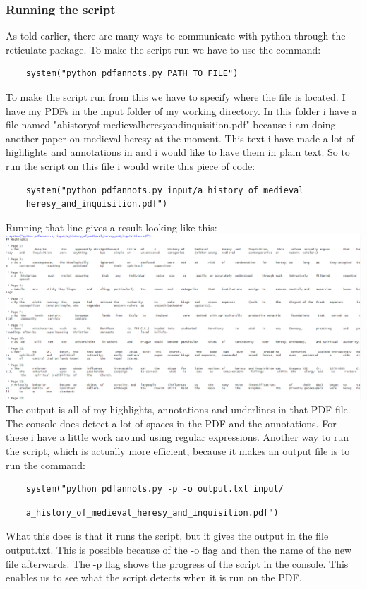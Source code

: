 \documentclass{article}
\begin{document}
\subsubsection{Running the script}
As told earlier, there are many ways to communicate with python through the reticulate package. To make the script run we have to use the command:
\begin{verbatim}
    system("python pdfannots.py PATH TO FILE")
\end{verbatim}
To make the script run from this we have to specify where the file is located. I have my PDFs in the input folder of my working directory. In this folder i have a file named "a\textunderscore history\textunderscore of \textunderscore medieval\textunderscore heresy\textunderscore and\textunderscore inquisition.pdf" because i am doing another paper on medieval heresy at the moment. This text i have made a lot of highlights and annotations in and i would like to have them in plain text. So to run the script on this file i would write this piece of code:
\begin{verbatim}
    system("python pdfannots.py input/a_history_of_medieval_
    heresy_and_inquisition.pdf")
\end{verbatim}
Running that line gives a result looking like this:\newline
\includegraphics[scale=0.5]{result_of_running_code.PNG} \newline
The output is all of my highlights, annotations and underlines in that PDF-file. The console does detect a lot of spaces in the PDF and the annotations. For these i have a little work around using regular expressions. Another way to run the script, which is actually more efficient, because it makes an output file is to run the command:
\begin{verbatim}
    system("python pdfannots.py -p -o output.txt input/ 
\end{verbatim} \newline
\begin{verbatim}
    a_history_of_medieval_heresy_and_inquisition.pdf")
\end{verbatim}
What this does is that it runs the script, but it gives the output in the file output.txt. This is possible because of the -o flag and then the name of the new file afterwards. The -p flag shows the progress of the script in the console. This enables us to see what the script detects when it is run on the PDF.
\end{document}
